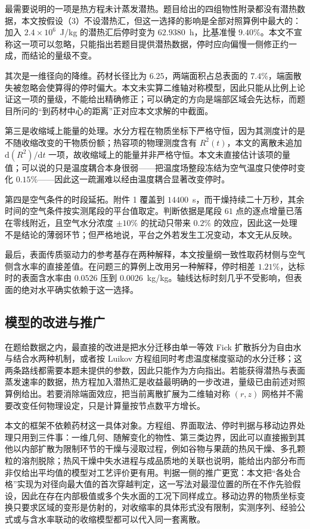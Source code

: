 最需要说明的一项是热方程未计蒸发潜热。题目给出的四组物性附录都没有潜热数据，本文按假设（3）不设潜热汇，但这一选择的影响是全部对照算例中最大的：加入 $2.4\times10^6$~J/kg 的潜热汇后停时变为 $62.9380$~h，比基准慢 $9.40\%$。本文不宣称这一项可以忽略，只能指出若题目提供潜热数据，停时应向偏慢一侧修正约一成，而结论的量级不变。

其次是一维径向的降维。药材长径比为 $6.25$，两端面积占总表面的 $7.4\%$，端面散失被忽略会使算得的停时偏大。本文未实算二维轴对称模型，因此只能从比例上论证这一项的量级，不能给出精确修正；可以确定的方向是端部区域会先达标，而题目所问的“到药材中心的距离”正对应本文求解的中截面。

第三是收缩域上能量的处理。水分方程在物质坐标下严格守恒，因为其测度计的是不随收缩改变的干物质份额；热容项的物理测度含有 $R^2(t)$，本文的离散未追加 $\mathrm{d}(R^2)/\mathrm{d}t$ 一项，故收缩域上的能量并非严格守恒。本文未直接估计该项的量值；可以说的只是温度耦合本身很弱——把温度场整段冻结为空气温度只使停时变化 $0.15\%$——因此这一疏漏难以经由温度耦合显著改变停时。

第四是空气条件的时段延拓。附件 1 覆盖到 $14400$~s，而干燥持续二十万秒，其余时间的空气条件按实测尾段的平台值取定。判断依据是尾段 $61$ 点的逐点增量已落在零线附近，且空气水分浓度 $\pm10\%$ 的扰动只带来 $0.2\%$ 的效应，因此这一处理不是结论的薄弱环节；但严格地说，平台之外若发生工况变动，本文无从反映。

最后，表面传质驱动力的参考基存在两种解释，本文按量纲一致性取药材侧与空气侧含水率的直接差值。在问题三的算例上改用另一种解释，停时相差 $1.21\%$，达标时的表面含水率由 $0.0526$ 压到 $0.0026$~kg/kg。轴线达标时刻几乎不受影响，但表面的绝对水平确实依赖于这一选择。

\subsection{模型的改进与推广}

在题给数据之内，最直接的改进是把水分迁移由单一等效 Fick 扩散拆分为自由水与结合水两种机制，或者按 Luikov 方程组同时考虑温度梯度驱动的水分迁移；这两条路线都需要本题未提供的参数，因此只能作为方向指出。若能获得潜热与表面蒸发速率的数据，热方程加入潜热汇是收益最明确的一步改进，量级已由前述对照算例给出。若要消除端面效应，把当前离散扩展为二维轴对称 $(r,z)$ 网格并不需要改变任何物理设定，只是计算量按节点数平方增长。

本文的框架不依赖药材这一具体对象。方程组、界面取法、停时判据与移动边界处理只用到三件事：一维几何、随解变化的物性、第三类边界，因此可以直接搬到其他以内部扩散为限制环节的干燥与浸取过程，例如谷物与果蔬的热风干燥、多孔颗粒的溶剂脱除；热风干燥中失水进程与成品质地的关联也说明，能给出内部分布而非仅给出平均值的模型对工艺评价更有用。判据一侧的推广更宽：本文把“各处合格”实现为对径向最大值的首次穿越判定，这一写法对最湿位置的所在不作先验假设，因此在存在内部极值或多个失水面的工况下同样成立。移动边界的物质坐标变换只要求区域的变形是仿射的，对收缩率的具体形式没有限制，实测序列、经验公式或与含水率联动的收缩模型都可以代入同一套离散。

